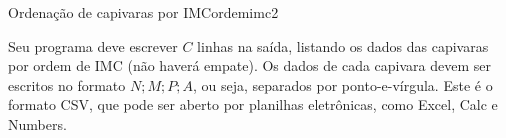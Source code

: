 \documentclass[12pt,a4paper,oneside]{article}
\begin{document}
\begin{problem}{Ordenação de capivaras por IMC}{ordemimc}{2}
\OutputFile

Seu programa deve escrever $C$ linhas na saída, listando os dados das capivaras por ordem de IMC (não haverá empate). Os dados de cada capivara devem ser escritos no formato $N;M;P;A$, ou seja, separados por ponto-e-vírgula. Este é o formato CSV, que pode ser aberto por planilhas eletrônicas, como Excel, Calc e Numbers.


\Example

\begin{example}
%
\end{example}

\begin{example}
%
\end{example}


\end{problem}
\end{document}
